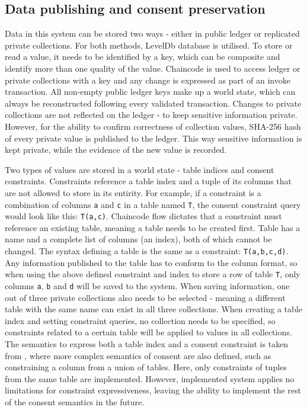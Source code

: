 \documentclass[12pt]{article}
\begin{document}
    \subsection{Data publishing and consent preservation}
    Data in this system can be stored two ways - either in public ledger or replicated private collections. For both methods, LevelDb database is utilised. To store or read a value, it needs to be identified by a key, which can be composite and identify more than one quality of the value. Chaincode is used to access ledger or private collections with a key and any change is expressed as part of an invoke transaction. All non-empty public ledger keys make up a world state, which can always be reconstructed following every validated transaction. Changes to private collections are not reflected on the ledger - to keep sensitive information private. However, for the ability to confirm correctness of collection values, SHA-256 hash of every private value is published to the ledger. This way sensitive information is kept private, while the evidence of the new value is recorded.
    
    Two types of values are stored in a world state - table indices and consent constraints. Constraints reference a table index and a tuple of its columns that are not allowed to store in its entirity. For example, if a constraint is a combination of columns \lstinline{a} and \lstinline{c} in a table named \lstinline{T}, the consent constraint query would look like this: \lstinline{T(a,c)}. Chaincode flow dictates that a constraint must reference an existing table, meaning a table needs to be created first. Table has a name and a complete list of columns (an index), both of which cannot be changed. The syntax defining a table is the same as a constraint: \lstinline{T(a,b,c,d)}. Any information published to the table has to conform to the column format, so when using the above defined constraint and index to store a row of table \lstinline{T}, only columns \lstinline{a}, \lstinline{b} and \lstinline{d} will be saved to the system. When saving information, one out of three private collections also needs to be selected - meaning a different table with the same name can exist in all three collections. When creating a table index and setting constraint queries, no collection needs to be specified, so constraints related to a certain table will be applied to values in all collections. The semantics to express both a table index and a consent constraint is taken from \cite{konstantinidis}, where more complex semantics of consent are also defined, such as constraining a column from a union of tables. Here, only constraints of tuples from the same table are implemented. However, implemented system applies no limitations for constraint expressiveness, leaving the ability to implement the rest of the consent semantics in the future.
\end{document}
